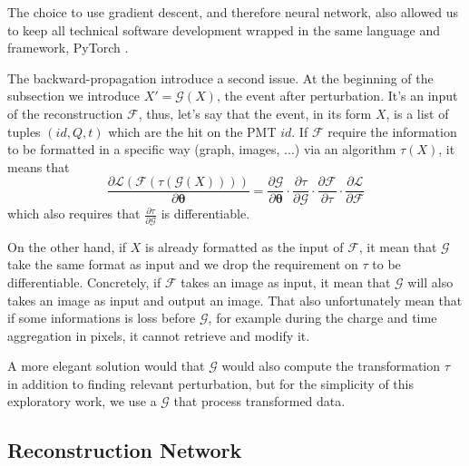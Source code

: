 \documentclass[../main.tex]{subfiles}
\begin{document}
The choice to use gradient descent, and therefore neural network, also allowed us to keep all technical software development wrapped in the same language and framework, PyTorch \cite{ansel_pytorch_2024}.

The backward-propagation introduce a second issue. At the beginning of the subsection we introduce $X' = \mathcal{G}(X)$, the event after perturbation. It's an input of the reconstruction $\mathcal{F}$, thus, let's say that the event, in its form $X$, is a list of tuples $(id, Q, t)$ which are the hit on the PMT $id$. If $\mathcal{F}$ require the information to be formatted in a specific way (graph, images, ...) via an algorithm $\tau(X)$, it means that
\begin{equation}
  \frac{\partial \mathcal{L}(\mathcal{F}(\tau(\mathcal{G}(X))))}{\partial \bm{\theta}} = \frac{\partial \mathcal{G}}{\partial \bm{\theta}} \cdot \frac{\partial \tau}{\partial \mathcal{G}} \cdot \frac{\partial \mathcal{F}}{\partial \tau} \cdot \frac{\partial \mathcal{L}}{\partial \mathcal{F}}
\end{equation}
which also requires that $\frac{\partial \tau}{\partial \mathcal{G}}$ is differentiable.

On the other hand, if $X$ is already formatted as the input of $\mathcal{F}$, it mean that $\mathcal{G}$ take the same format as input and we drop the requirement on $\tau$ to be differentiable. Concretely, if $\mathcal{F}$ takes an image as input, it mean that $\mathcal{G}$ will also takes an image as input and output an image. That also unfortunately mean that if some informations is loss before $\mathcal{G}$, for example during the charge and time aggregation in pixels, it cannot retrieve and modify it.

A more elegant solution would that $\mathcal{G}$ would also compute the transformation $\tau$ in addition to finding relevant perturbation, but for the simplicity of this exploratory work, we use a $\mathcal{G}$ that process transformed data.

\subsection{Reconstruction Network}
\label{sec:janne:arch:reco}
\end{document}
